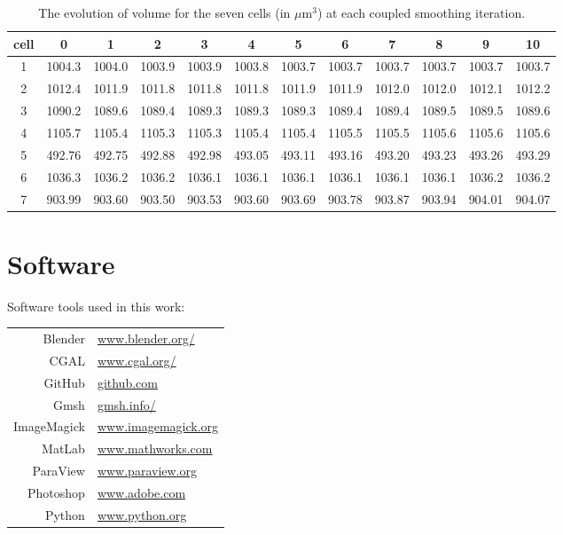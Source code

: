 \documentclass[a4paper,10pt]{article}
\begin{document}
\begin{table}[H]
\begin{center}
\footnotesize
\begin{tabular}{|c|ccccccccccc|}
\hline
cell & 0 &1 &2 &3 &4 &5 &6 &7 &8 &9 &10\\
\hline
1 &1004.3 &1004.0 &1003.9 &1003.9 &1003.8 &1003.7 &1003.7 &1003.7 &1003.7 &1003.7 &1003.7\\
2 &1012.4 &1011.9 &1011.8 &1011.8 &1011.8 &1011.9 &1011.9 &1012.0 &1012.0 &1012.1 &1012.2\\
3 &1090.2 &1089.6 &1089.4 &1089.3 &1089.3 &1089.3 &1089.4 &1089.4 &1089.5 &1089.5 &1089.6\\
4 &1105.7 &1105.4 &1105.3 &1105.3 &1105.4 &1105.4 &1105.5 &1105.5 &1105.6 &1105.6 &1105.6\\
5 &492.76 &492.75 &492.88 &492.98 &493.05 &493.11 &493.16 &493.20 &493.23 &493.26 &493.29\\
6 &1036.3 &1036.2 &1036.2 &1036.1 &1036.1 &1036.1 &1036.1 &1036.1 &1036.1 &1036.2 &1036.2\\
7 &903.99 &903.60 &903.50 &903.53 &903.60 &903.69 &903.78 &903.87 &903.94 &904.01 &904.07\\
\hline
\end{tabular}
\end{center}
\caption{The evolution of volume for the seven cells (in $\mu \text{m}^3$)  at each coupled smoothing iteration.}
\label{tab:vol}
\end{table}

\section{Software}
Software tools used in this work:
\begin{table}[H]
\begin{tabular}{rl}
Blender &\url{www.blender.org/}\\
CGAL &\url{www.cgal.org/}\\
GitHub &\url{github.com}\\
Gmsh &\url{gmsh.info/}\\
ImageMagick &\url{www.imagemagick.org}\\
MatLab &\url{www.mathworks.com}\\
ParaView &\url{www.paraview.org}\\
Photoshop &\url{www.adobe.com}\\
Python &\url{www.python.org}\\
\end{tabular}
\end{table}
\end{document}

